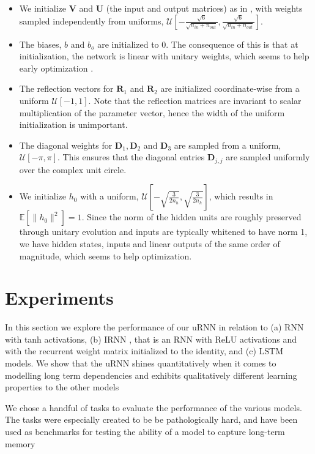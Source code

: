 \documentclass{article} %
\newcommand{\matr}[1]{\mathbf{#1}}
\begin{document}
\begin{itemize}
  \item We initialize $\matr{V}$ and $\matr{U}$ (the input and output matrices) as in \cite{Glorotinit},
  with weights sampled independently from uniforms, $\mathcal{U}\left[-\frac{\sqrt{6}}{\sqrt{n_{in}+ n_{out}}}, \frac{\sqrt{6}}{\sqrt{n_{in}+ n_{out}}}\right]$.
  \item The biases, $b$ and $b_o$ are initialized to 0. The consequence of this is that at initialization, 
    the network is linear with unitary weights, which seems to help early optimization \citep{Saxe2014}.
  \item The reflection vectors for $\matr{R}_1$ and $\matr{R}_2$ are initialized coordinate-wise from a 
  uniform $\mathcal{U}[-1, 1]$. Note that the reflection matrices are invariant to scalar multiplication 
  of the parameter vector, hence the width of the uniform initialization is unimportant.
  \item The diagonal weights for $\matr{D}_1, \matr{D}_2$ and $\matr{D}_3$ are sampled 
  from a uniform, $\mathcal{U}[-\pi, \pi]$. This ensures that the diagonal entries $\matr{D}_{j,j}$
  are sampled uniformly over the complex unit circle.
  \item We initialize $h_0$ with a uniform, 
  $\mathcal{U}\left[-\sqrt{\frac{3}{2n_h}}, \sqrt{\frac{3}{2n_h}} \right]$, 
  which results in $\mathbb{E}\left[\|h_0\|^2\right] = 1$. Since the norm of the hidden units are roughly 
  preserved through unitary evolution and inputs are typically whitened to have norm 1, 
  we have hidden states, inputs and linear outputs of the same order of magnitude, which seems to
  help optimization.
\end{itemize}

\section{Experiments}
\label{expts}

In this section we explore the performance of our uRNN in relation to (a) RNN with tanh activations,
(b) IRNN \citep{Quoc2015}, that is 
an RNN with ReLU activations and with the recurrent weight matrix initialized to the identity, 
and (c) LSTM \citep{LSTM} models. We show that the uRNN shines quantitatively when it comes to modelling 
long term dependencies and exhibits qualitatively different learning properties to the other models 
 
We chose a handful of tasks to evaluate the performance of the various models.
The tasks were especially created to be be pathologically hard, and have been used 
as benchmarks for testing the ability of a model to capture long-term memory \citep{LSTM, Quoc2015, NTM, HF}
\end{document}

